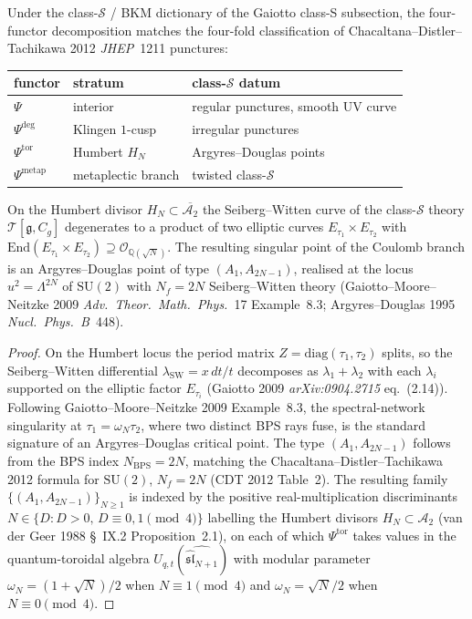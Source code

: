 Under the class-$\mathcal S$ / BKM dictionary of
the Gaiotto class-S subsection, the four-functor
decomposition matches the four-fold classification of
Chacaltana--Distler--Tachikawa 2012 \textit{JHEP}~1211 punctures:
\begin{center}
\begin{tabular}{lll}
\toprule
functor & stratum & class-$\mathcal S$ datum \\
\midrule
$\Psi$ & interior & regular punctures, smooth UV curve \\
$\Psi^{\deg}$ & Klingen $1$-cusp & irregular punctures \\
$\Psi^{\mathrm{tor}}$ & Humbert $H_N$ & Argyres--Douglas points \\
$\Psi^{\mathrm{metap}}$ & metaplectic branch & twisted
class-$\mathcal S$ \\
\bottomrule
\end{tabular}
\end{center}

\begin{theorem}[Humbert \texorpdfstring{$=$}{=} Argyres--Douglas]
\label{thm:humbert-equals-ad}
On the Humbert divisor $H_N \subset \overline{\mathcal A_2}$ the
Seiberg--Witten curve of the class-$\mathcal S$ theory
$\mathcal T[\mathfrak g, C_g]$ degenerates to a product of two
elliptic curves $E_{\tau_1}\times E_{\tau_2}$ with
$\mathrm{End}(E_{\tau_1}\times E_{\tau_2}) \supseteq
\mathcal O_{\mathbb Q(\sqrt N)}$. The resulting singular point
of the Coulomb branch is an Argyres--Douglas point of type
$(A_1, A_{2N - 1})$, realised at the locus
$u^2 = \Lambda^{2N}$ of $\mathrm{SU}(2)$ with $N_f = 2N$
Seiberg--Witten theory (Gaiotto--Moore--Neitzke 2009
\textit{Adv.~Theor.~Math.~Phys.}~17 Example~8.3;
Argyres--Douglas 1995 \textit{Nucl.~Phys.~B}~448).
\end{theorem}

\begin{proof}[Proof]
On the Humbert locus the period matrix
$Z = \mathrm{diag}(\tau_1, \tau_2)$ splits, so the
Seiberg--Witten differential
$\lambda_{\mathrm{SW}} = x\, dt/t$ decomposes as
$\lambda_1 + \lambda_2$ with each $\lambda_i$ supported on
the elliptic factor $E_{\tau_i}$ (Gaiotto 2009
\textit{arXiv:0904.2715} eq.~(2.14)). Following
Gaiotto--Moore--Neitzke 2009 Example~8.3, the
spectral-network singularity at $\tau_1 = \omega_N \tau_2$,
where two distinct BPS rays fuse, is the standard signature
of an Argyres--Douglas critical point. The type
$(A_1, A_{2N - 1})$ follows from the BPS index
$N_{\mathrm{BPS}} = 2N$, matching the Chacaltana--Distler--Tachikawa
2012 formula for $\mathrm{SU}(2)$, $N_f = 2N$ (CDT 2012 Table~2).
The resulting family
$\{(A_1, A_{2N - 1})\}_{N \ge 1}$ is indexed by the positive
real-multiplication discriminants $N \in \{D : D > 0,
\, D \equiv 0, 1\!\!\pmod 4\}$ labelling the Humbert divisors
$H_N \subset \mathcal A_2$ (van der Geer 1988 \S~IX.2
Proposition~2.1), on each of which $\Psi^{\mathrm{tor}}$ takes
values in the quantum-toroidal algebra
$U_{q, t}(\widehat{\widehat{\mathfrak{sl}}_{N+1}})$ with modular
parameter $\omega_N = (1 + \sqrt N)/2$ when $N \equiv 1\!\!\pmod 4$
and $\omega_N = \sqrt N / 2$ when $N \equiv 0\!\!\pmod 4$.
\end{proof}

